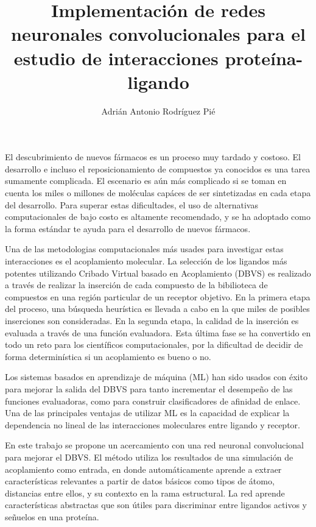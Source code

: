 \documentclass{article}
\begin{document}
\title{Implementación de redes neuronales convolucionales para el estudio de interacciones proteína-ligando}
\author{Adrián Antonio Rodríguez Pié}
\date{}

\maketitle

El descubrimiento de nuevos fármacos es un proceso muy tardado y costoso.
El desarrollo e incluso el reposicionamiento de compuestos ya conocidos es una
tarea sumamente complicada. El escenario es aún más complicado si se toman en cuenta
los miles o millones de moléculas capáces de ser sintetizadas en cada etapa del desarrollo.
Para superar estas dificultades, el uso de alternativas computacionales de bajo costo
es altamente recomendado, y se ha adoptado como la forma estándar te ayuda para el
desarrollo de nuevos fármacos.

Una de las metodologias computacionales más usades para investigar estas interacciones es
el acoplamiento molecular. La selección de los ligandos más potentes utilizando Cribado
Virtual basado en Acoplamiento (DBVS) es realizado a través de realizar la inserción de
cada compuesto de la bibilioteca de compuestos en una región particular de un receptor
objetivo. En la primera etapa del proceso, una búsqueda heurística es llevada a cabo
en la que miles de posibles inserciones son consideradas. En la segunda etapa, la calidad
de la inserción es evaluada a través de una función evaluadora. Esta última fase se ha
convertido en todo un reto para los científicos computacionales, por la dificultad de decidir
de forma determinística si un acoplamiento es bueno o no.

Los sistemas basados en aprendizaje de máquina (ML) han sido usados con éxito para mejorar la
salida del DBVS para tanto incrementar el desempeño de las funciones evaluadoras, como para
construir clasificadores de afinidad de enlace. Una de las principales ventajas de utilizar ML
es la capacidad de explicar la dependencia no lineal de las interacciones moleculares entre
ligando y receptor.

En este trabajo se propone un acercamiento con una red neuronal convolucional para mejorar el
DBVS. El método utiliza los resultados de una simulación de acoplamiento como entrada, en
donde automáticamente aprende a extraer características relevantes a partir de datos básicos
como tipos de átomo, distancias entre ellos, y su contexto en la rama estructural. La red
aprende características abstractas que son útiles para discriminar entre ligandos activos y
señuelos en una proteína.
\end{document}
